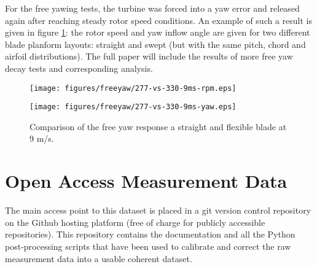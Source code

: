 \documentclass[a4paper]{jpconf}
\begin{document}


For the free yawing tests, the turbine was forced into a yaw error and released again after reaching steady rotor speed conditions. An example of such a result is given in figure \ref{freeyaw-flex-vs-samo}: the rotor speed and yaw inflow angle are given for two different blade planform layouts: straight and swept (but with the same pitch, chord and airfoil distributions). The full paper will include the results of more free yaw decay tests and corresponding analysis.

\begin{figure}[h]
\centering
\begin{minipage}{\textwidth}
\centering
\texttt{[image: figures/freeyaw/277-vs-330-9ms-rpm.eps]}
\end{minipage}
\begin{minipage}{\textwidth}
\centering
\texttt{[image: figures/freeyaw/277-vs-330-9ms-yaw.eps]}
\caption{\label{freeyaw-flex-vs-samo} Comparison of the free yaw response a straight and flexible blade at 9 m/s.}
\end{minipage} 
\end{figure}


\section{Open Access Measurement Data}

The main access point to this dataset is placed in a git version control repository on the Github hosting platform (free of charge for publicly accessible repositories). This repository \cite{github:freeyaw-ojf-wt-tests} contains the documentation and all the Python post-processing scripts that have been used to calibrate and correct the raw measurement data into a usable coherent dataset.
\end{document}
